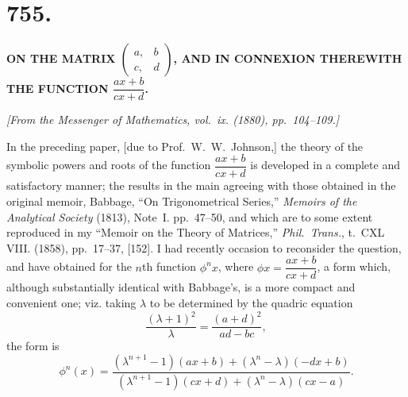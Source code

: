 \documentclass[11pt,a4paper]{book}
\begin{document}
\newpage


\section*{755.}

\begin{center}
\textbf{ON THE MATRIX $\left(\begin{array}{c|c} a, & b \\ \hline c, & d \end{array}\right)$,
AND IN CONNEXION THEREWITH}\\[4pt]
\textbf{THE FUNCTION $\dfrac{ax+b}{cx+d}$.}
\end{center}

\begin{flushright}
\textit{[From the Messenger of Mathematics, vol.~ix. (1880), pp.~104--109.]}
\end{flushright}

In the preceding paper, [due to Prof.~W.~W.~Johnson,] the theory of the symbolic
powers and roots of the function $\dfrac{ax+b}{cx+d}$ is developed in a complete and satisfactory
manner; the results in the main agreeing with those obtained in the original memoir,
Babbage, ``On Trigonometrical Series,'' \textit{Memoirs of the Analytical Society} (1813), Note~I.
pp.~47--50, and which are to some extent reproduced in my ``Memoir on the Theory
of Matrices,'' \textit{Phil.\ Trans.}, t.~CXL VIII. (1858), pp.~17--37, [152]. I had recently
occasion to reconsider the question, and have obtained for the $n$th function $\phi^n x$, where
$\phi x = \dfrac{ax+b}{cx+d}$, a form which, although substantially identical with Babbage's, is a more
compact and convenient one; viz. taking $\lambda$ to be determined by the quadric equation
%
\[
\frac{(\lambda + 1)^2}{\lambda} = \frac{(a+d)^2}{ad-bc},
\]
%
the form is
%
\[
\phi^n(x) = \frac{(\lambda^{n+1} - 1)(ax+b) + (\lambda^n - \lambda)(-dx+b)}
{(\lambda^{n+1} - 1)(cx+d) + (\lambda^n - \lambda)(cx-a)}.
\]
\end{document}
